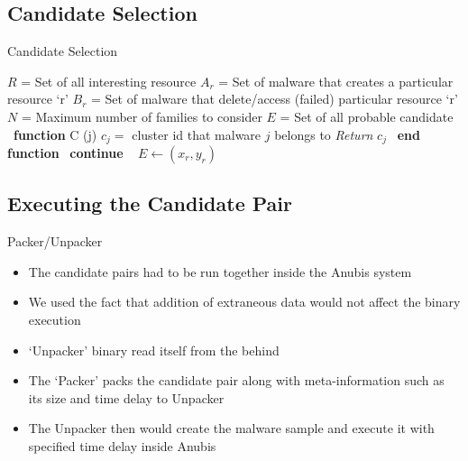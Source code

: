 \documentclass[]{beamer}
\begin{document}
\subsection{Candidate Selection}
\label{sub:Candidate Selection}
\begin{frame}[plain]{Candidate Selection}
\begin{algorithm}[H]
  \small
  \begin{algorithmic}[1]
    \STATE$R$   = Set of all interesting resource
    \STATE$A_r$ = Set of malware that creates a particular resource `r'
    \STATE$B_r$ = Set of malware that delete/access (failed) particular resource `r'
    \STATE$N$   = Maximum number of families to consider
    \STATE$E$   = Set of all probable candidate
    \STATE\ \textbf{function} C (j)
      \STATE\hspace{\algorithmicindent} $c_j =$ cluster id that malware $j$ belongs to
      \STATE\hspace{\algorithmicindent} \textit{Return} $c_j$
    \STATE\ \textbf{end function}
        \STATE\ \textbf{continue}
      \ENDIF\
          \STATE$E\gets (x_r, y_r)$
        \ENDIF\
      \ENDFOR\
    \ENDFOR\
  \end{algorithmic}
\end{algorithm}
\end{frame}

\subsection{Executing the Candidate Pair}
\label{sub:Executing the Candidate Pair}
\begin{frame}[t]{Packer/Unpacker}
  \begin{itemize}
    \item The candidate pairs had to be run together inside the Anubis system
    \item We used the fact that addition of extraneous data would not affect the binary execution
    \item `Unpacker' binary read itself from the behind
    \item The `Packer' packs the candidate pair along with meta-information such as its size and time delay to Unpacker
    \item The Unpacker then would create the malware sample and execute it with specified time delay inside Anubis
  \end{itemize}
\end{frame}
\end{document}
